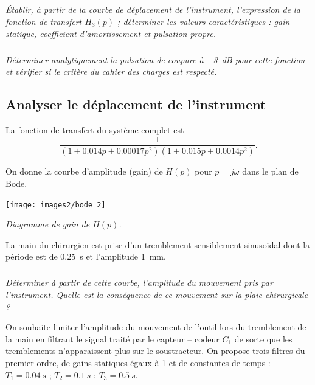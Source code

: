 \documentclass[10pt,fleqn]{article} %
\begin{document}
\subparagraph{}\textit{Établir, à partir de la courbe de déplacement de l'instrument, l'expression de la fonction de transfert $H_3(p)$ ; déterminer les valeurs caractéristiques : gain statique, coefficient d'amortissement et pulsation propre.}


\subparagraph{}\textit{Déterminer analytiquement la pulsation de coupure à \SI{-3}{dB} pour cette fonction et vérifier si le critère du cahier des charges est respecté.}

\subsection{Analyser le déplacement de l'instrument \\}

La fonction de transfert du système complet est 
$$\frac{1}{(1+\num{0,014} p+\num{0,00017} p^2)(1+\num{0,015} p+\num{0,0014} p^2)}.$$

On donne la courbe d'amplitude (gain) de $H(p)$ pour
$p = j\omega$ dans le plan de Bode.


\begin{center}
	\texttt{[image: images2/bode\_2]}

\textit{Diagramme de gain de $H(p)$.}
\end{center}
%

La main du chirurgien est prise d'un tremblement sensiblement sinusoïdal dont la période est de \SI{0,25}{s} et l'amplitude \SI{1}{mm}.


\subparagraph{}\textit{Déterminer à partir de cette courbe, l'amplitude du mouvement pris par l'instrument. Quelle est la conséquence de ce mouvement sur la plaie chirurgicale ?}


On souhaite limiter l'amplitude du mouvement de l'outil lors du tremblement de la main en filtrant le signal traité par le capteur -- codeur $C_1$ de sorte que les tremblements n'apparaissent plus sur le soustracteur. On propose trois filtres du premier ordre, de gains statiques égaux à 1 et de constantes de temps : $T_1 =\SI{0,04}{s}$ ; $T_2 = \SI{0,1}{s}$ ; $T_3 = \SI{0,5}{s}$.
\end{document}

